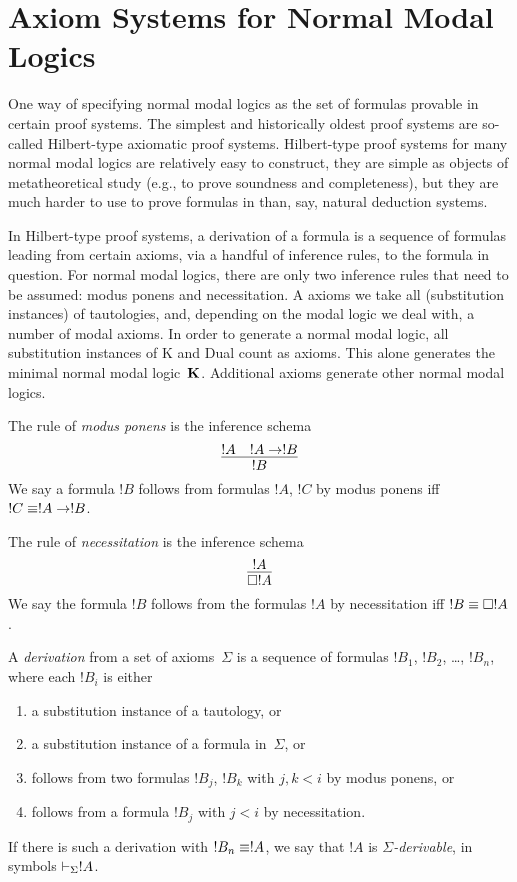 \documentclass[modal-logic]{subfiles}
\begin{document}
\section{Axiom Systems for Normal Modal Logics}

One way of specifying normal modal logics as the set of formulas provable in certain proof systems.  The simplest and historically oldest proof systems are so-called Hilbert-type axiomatic proof systems.  Hilbert-type proof systems for many normal modal logics are relatively easy to construct, they are simple as objects of metatheoretical study (e.g., to prove soundness and completeness), but they are much harder to use to prove formulas in than, say, natural deduction systems.

In Hilbert-type proof systems, a derivation of a formula is a sequence of formulas leading from certain axioms, via a handful of inference rules, to the formula in question.  For normal modal logics, there are only two inference rules that need to be assumed: modus ponens and necessitation.  A axioms we take all (substitution instances) of tautologies, and, depending on the modal logic we deal with, a number of modal axioms. In order to generate a normal modal logic, all substitution instances of K and Dual count as axioms. This alone generates the minimal normal modal logic~$\mathbf K$.  Additional axioms generate other normal modal logics.

\begin{defn}
The rule of \emph{modus ponens} is the inference schema
\[
\infer{!B}{!A & !A \lif !B}
\]
We say a formula $!B$ follows from formulas $!A$, $!C$ by modus ponens iff $!C \equiv !A \to !B$.
\end{defn}

\begin{defn}
The rule of \emph{necessitation} is the inference schema
\[
\infer{\Box !A}{!A}
\]
We say the formula $!B$ follows from the formulas $!A$ by necessitation iff $!B \equiv \Box !A$.
\end{defn}

\begin{defn}
A \emph{derivation} from a set of axioms~$\Sigma$ is a sequence of formulas $!B_1$, $!B_2$, \dots, $!B_n$, where each $!B_i$ is either
\begin{enumerate}
\item a substitution instance of a tautology, or
\item a substitution instance of a formula in~$\Sigma$, or
\item follows from two formulas $!B_j$, $!B_k$ with $j, k < i$ by modus ponens, or
\item follows from a formula $!B_j$ with $j < i$  by necessitation.
\end{enumerate}
If there is such a derivation with $!B_n \equiv !A$, we say that $!A$ is \emph{$\Sigma$-derivable}, in symbols $\vdash_{\Sigma} !A$.
\end{defn}
\end{document}
